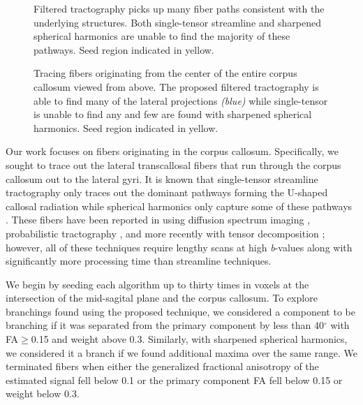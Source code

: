 \documentclass[final,hyperref]{gatech-thesis}
\renewcommand{\deg}{\ensuremath{^\circ}\xspace}
\begin{document}
\begin{figure}[t]
  \centering
  \caption{Filtered tractography picks up many fiber paths consistent with the
    underlying structures.  Both single-tensor streamline and sharpened
    spherical harmonics are unable to find the majority of these
    pathways. Seed region indicated in yellow.}
  \label{fig:TW_tc}
\end{figure}
\begin{figure}[t]
  \centering
  \caption{Tracing fibers originating from the center of the entire corpus
    callosum viewed from above.  The proposed filtered tractography is able to
    find many of the lateral projections \textit{(blue)} while single-tensor
    is unable to find any and few are found with sharpened spherical
    harmonics. Seed region indicated in yellow.}
  \label{fig:TW_cc}
\end{figure}
Our work focuses on fibers originating in the corpus callosum.
Specifically, we sought to trace out the lateral transcallosal fibers that run
through the corpus callosum out to the lateral gyri.  It is known that
single-tensor streamline tractography only traces out the dominant pathways
forming the U-shaped callosal radiation while spherical harmonics only capture
some of these pathways \cite{Descoteaux2007,Schultz2008}.
%
These fibers have been reported in using diffusion spectrum imaging
\cite{Hagmann2004}, probabilistic tractography
\cite{Kaden2007,Anwander2007,Descoteaux2007}, and more recently with tensor
decomposition \cite{Schultz2008}; however, all of these techniques require
lengthy scans at high \textit{b}-values along with significantly more
processing time than streamline techniques.

We begin by seeding each algorithm up to thirty times in voxels at the
intersection of the mid-sagital plane and the corpus callosum.  To explore
branchings found using the proposed technique, we considered a component to be
branching if it was separated from the primary component by less than 40\deg
with FA$\ge$0.15 and weight above 0.3.  Similarly, with sharpened spherical
harmonics, we considered it a branch if we found additional maxima over the
same range.  We terminated fibers when either the generalized fractional
anisotropy \cite{Tuch2002} of the estimated signal fell below 0.1 or the
primary component FA fell below 0.15 or weight below 0.3.
\end{document}
